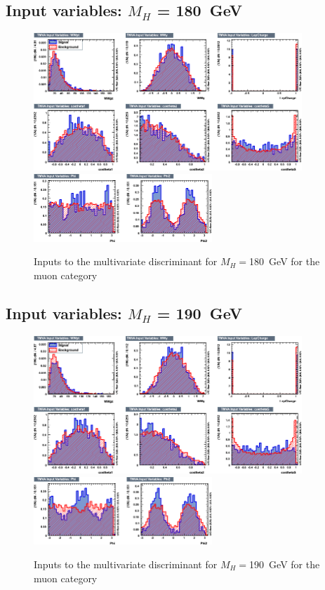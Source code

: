 \subsection{Input variables: \texorpdfstring{$M_H$}{M(H)} = 180~GeV}
\begin{figure}[ht]
  \centering
  \includegraphics[width=0.9\textwidth]{plots/2012_MVA/TMVA_180_nJ2_mu_variables_id_c1.png}
  \includegraphics[width=0.6\textwidth]{plots/2012_MVA/TMVA_180_nJ2_mu_variables_id_c2.png}	
  \caption{\label{fig:inputs180mu}Inputs to the multivariate discriminant for $M_H = $180~GeV for the muon category}
\end{figure}
\newpage
\subsection{Input variables: \texorpdfstring{$M_H$}{M(H)} = 190~GeV}
\begin{figure}[ht]
  \centering
  \includegraphics[width=0.9\textwidth]{plots/2012_MVA/TMVA_190_nJ2_mu_variables_id_c1.png}
  \includegraphics[width=0.6\textwidth]{plots/2012_MVA/TMVA_190_nJ2_mu_variables_id_c2.png}	
  \caption{\label{fig:inputs190mu}Inputs to the multivariate discriminant for $M_H = $190~GeV for the muon category}
\end{figure}
\newpage
